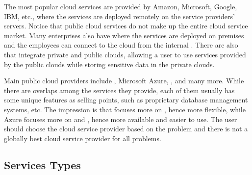 The most popular cloud services are  provided by Amazon, Microsoft, Google, IBM, etc., where the services are deployed remotely on the service providers' servers. Notice that public cloud services do not make up the entire cloud service market. Many enterprises also have  where the services are deployed on premises and the employees can connect to the cloud from the internal . There are also  that integrate private and public clouds, allowing a user to use services provided by the public clouds while storing sensitive data in the private clouds.

Main public cloud providers include , Microsoft Azure, , and many more. While there are overlaps among the services they provide, each of them usually has some unique features as selling points, such as proprietary database management systems, etc. The impression is that  focuses more on , hence more flexible, while Azure focuses more on  and , hence more available and easier to use. The user should choose the cloud service provider based on the problem and there is not a globally best cloud service provider for all problems.

\subsection{Services Types}

